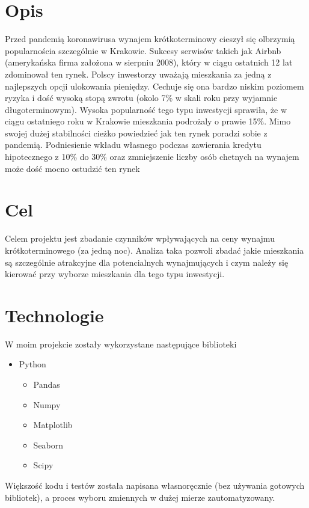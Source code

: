 \section{Opis}\label{sec:opis}

Przed pandemią koronawirusa wynajem krótkoterminowy cieszył się olbrzymią popularnościa szczególnie w Krakowie.
Sukcesy serwisów takich jak Airbnb (amerykańska firma założona w sierpniu 2008), który w ciągu ostatnich 12 lat zdominował ten rynek.
Polscy inwestorzy uważają mieszkania za jedną z najlepszych opcji ulokowania pieniędzy.
Cechuje się ona bardzo niskim poziomem ryzyka i dość wysoką stopą zwrotu (okolo 7\% w skali roku przy wyjamnie długoterminowym).
Wysoka popularność tego typu inwestycji sprawiła, że w ciągu ostatniego roku w Krakowie mieszkania podrożaly o prawie 15\%.
Mimo swojej dużej stabilności cieżko powiedzieć jak ten rynek poradzi sobie z pandemią.
Podniesienie wkładu własnego podczas zawierania kredytu hipotecznego z 10\% do 30\% oraz zmniejszenie liczby osób chetnych na wynajem może dość mocno ostudzić ten rynek

\section{Cel}\label{sec:cel}
Celem projektu jest zbadanie czynników wpływających na ceny wynajmu krótkoterminowego (za jedną noc).
Analiza taka pozwoli zbadać jakie mieszkania są szczególnie atrakcyjne dla potencialnych wynajmujących i czym należy się kierować przy wyborze mieszkania dla tego typu inwestycji.

\section{Technologie}\label{sec:technologie}

W moim projekcie zostały wykorzystane następujące biblioteki
\begin{itemize}
    \item Python
    \begin{itemize}
        \item Pandas
        \item Numpy
        \item Matplotlib
        \item Seaborn
        \item Scipy
    \end{itemize}
\end{itemize}

Większość kodu i testów została napisana własnoręcznie (bez używania gotowych bibliotek), a proces wyboru zmiennych w dużej mierze zautomatyzowany.